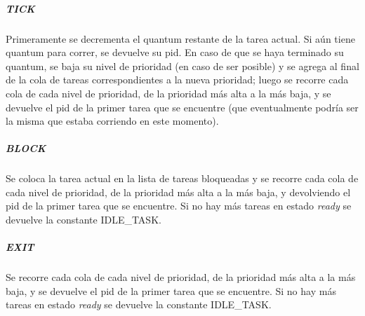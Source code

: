 \subparagraph{TICK} Primeramente se decrementa el quantum restante de la tarea actual.  Si aún tiene quantum para correr, se devuelve su pid.  En caso de que se haya terminado su quantum, se baja su nivel de prioridad (en caso de ser posible) y se agrega al final de la cola de tareas correspondientes a la nueva prioridad; luego se recorre cada cola de cada nivel de prioridad, de la prioridad más alta a la más baja, y se devuelve el pid de la primer tarea que se encuentre (que eventualmente podría ser la misma que estaba corriendo en este momento).
\subparagraph{BLOCK} Se coloca la tarea actual en la lista de tareas bloqueadas y se recorre cada cola de cada nivel de prioridad, de la prioridad más alta a la más baja, y devolviendo el pid de la primer tarea que se encuentre. Si no hay más tareas en estado {\it ready} se devuelve la constante IDLE_TASK.
\subparagraph{EXIT} Se recorre cada cola de cada nivel de prioridad, de la prioridad más alta a la más baja, y se devuelve el pid de la primer tarea que se encuentre. Si no hay más tareas en estado {\it ready} se devuelve la constante IDLE_TASK.